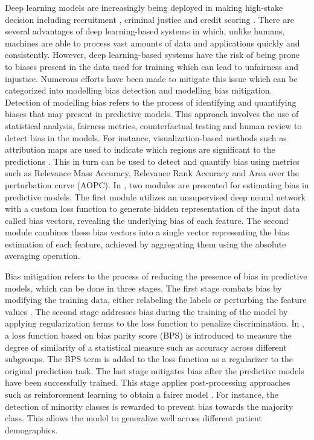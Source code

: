 \documentclass[preprint,12pt]{elsarticle}
\begin{document}
Deep learning models are increasingly being deployed in making high-stake decision including recruitment \citep{freire_e-recruitment_2021}, criminal justice \citep{dass_detecting_2023} and credit scoring \citep{gicic2023intelligent}. There are several advantages of deep learning-based systems in which, unlike humans, machines are able to process vast amounts of data and applications quickly and consistently. However, deep learning-based systems have the risk of being prone to biases present in the data used for training which can lead to unfairness and injustice. Numerous efforts have been made to mitigate this issue which can be categorized into modelling bias detection and modelling bias mitigation. Detection of modelling bias refers to the process of identifying and quantifying biases that may present in predictive models. This approach involves the use of statistical analysis, fairness metrics, counterfactual testing and human review to detect bias in the models. For instance, visualization-based methods such as attribution maps are used to indicate which regions are significant to the predictions \citep{schaaf_towards_2021}. This in turn can be used to detect and quantify bias using metrics such as Relevance Mass Accuracy, Relevance Rank Accuracy and Area over the perturbation curve (AOPC). In \citep{giloni_benn_2022}, two modules are presented for estimating bias in predictive models. The first module utilizes an unsupervised deep neural network with a custom loss function to generate hidden representation of the input data called bias vectors, revealing the underlying bias of each feature. The second module combines these bias vectors into a single vector representing the bias estimation of each feature, achieved by aggregating them using the absolute averaging operation. 

Bias mitigation refers to the process of reducing the presence of bias in predictive models, which can be done in three stages. The first stage combats bias by modifying the training data, either relabeling the labels or perturbing the feature values \citep{iosifidis_fairness-enhancing_2019,kehrenberg_tuning_2020}. The second stage addresses bias during the training of the model by applying regularization terms to the loss function to penalize discrimination. In \citep{jain_increasing_2023}, a loss function based on bias parity score (BPS) is introduced to measure the degree of similarity of a statistical measure such as accuracy across different subgroups. The BPS term is added to the loss function as a regularizer to the original prediction task. The last stage mitigates bias after the predictive models have been successfully trained. This stage applies post-processing approaches such as reinforcement learning to obtain a fairer model \citep{yang_algorithmic_2023}. For instance, the detection of minority classes is rewarded to prevent bias towards the majority class. This allows the model to generalize well across different patient demographics.
\end{document}
